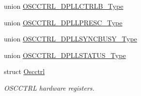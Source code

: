 \begin{DoxyCompactItemize}
\item 
union \hyperlink{union_o_s_c_c_t_r_l___d_p_l_l_c_t_r_l_b___type}{O\+S\+C\+C\+T\+R\+L\+\_\+\+D\+P\+L\+L\+C\+T\+R\+L\+B\+\_\+\+Type}
\item 
union \hyperlink{union_o_s_c_c_t_r_l___d_p_l_l_p_r_e_s_c___type}{O\+S\+C\+C\+T\+R\+L\+\_\+\+D\+P\+L\+L\+P\+R\+E\+S\+C\+\_\+\+Type}
\item 
union \hyperlink{union_o_s_c_c_t_r_l___d_p_l_l_s_y_n_c_b_u_s_y___type}{O\+S\+C\+C\+T\+R\+L\+\_\+\+D\+P\+L\+L\+S\+Y\+N\+C\+B\+U\+S\+Y\+\_\+\+Type}
\item 
union \hyperlink{union_o_s_c_c_t_r_l___d_p_l_l_s_t_a_t_u_s___type}{O\+S\+C\+C\+T\+R\+L\+\_\+\+D\+P\+L\+L\+S\+T\+A\+T\+U\+S\+\_\+\+Type}
\item 
struct \hyperlink{struct_oscctrl}{Oscctrl}
\begin{DoxyCompactList}\small\item\em O\+S\+C\+C\+T\+R\+L hardware registers. \end{DoxyCompactList}\end{DoxyCompactItemize}
